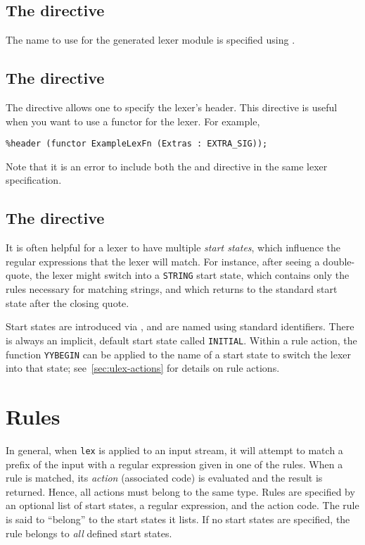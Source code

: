 \subsection{The  directive}

The name to use for the generated lexer module is specified using .

\subsection{The  directive}
The  directive allows one to specify the lexer's header.
This directive is useful when you want to use a functor for the lexer.
For example,
\begin{lstlisting}
%header (functor ExampleLexFn (Extras : EXTRA_SIG));
\end{lstlisting}%
Note that it is an error to include both the  and  directive in the
same lexer specification.

\subsection{The  directive}
\label{sec:start-states}

It is often helpful for a lexer to have multiple \emph{start states}, which influence the regular expressions that the lexer will match.  For instance, after seeing a double-quote, the lexer might switch into a \texttt{STRING} start state, which contains only the rules necessary for matching strings, and which returns to the standard start state after the closing quote.

Start states are introduced via , and are named using standard identifiers.  There is always an implicit, default start state called \texttt{INITIAL}.  Within a rule action, the function \texttt{YYBEGIN} can be applied to the name of a start state to switch the lexer into that state; see~\ref{sec:ulex-actions} for details on rule actions.

\section{Rules}\label{sec:ulex-rules}

In general, when \texttt{lex} is applied to an input stream, it will attempt to match a prefix of the input with a regular expression given in one of the rules.  When a rule is matched, its \emph{action} (associated code) is evaluated and the result is returned.  Hence, all actions must belong to the same type. %
Rules are specified by an optional list of start states, a regular expression, and the action code.  The rule is said to ``belong'' to the start states it lists.  If no start states are specified, the rule belongs to \emph{all} defined start states.

